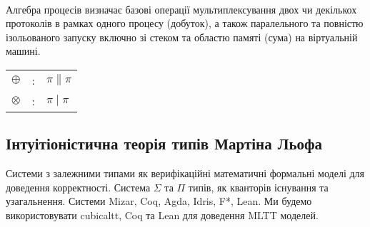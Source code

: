 \documentclass[9pt]{memoir}
\begin{document}
\begin{prooftree}
\end{prooftree}

\begin{prooftree}
\end{prooftree}

\begin{prooftree}
\end{prooftree}
\paragraph{}

    \paragraph{}
    Алгебра процесів визначає базові операції мультиплексування двох чи декількох
    протоколів в рамках одного процесу (добуток), а також паралельного та повністю
    ізольованого запуску включно зі стеком та областю памяті (сума) на
    віртуальній машині.

\begin{center}
\begin{tabular}{lcl}
$\oplus$   &:& $\pi \parallel \pi$\\
$\otimes$  &:& $\pi \mid \pi$\\
\end{tabular}
\end{center}

\newpage
    \subsection{Інтуітіоністична теорія типів Мартіна Льофа}
    Системи з залежними типами як верифікаційні математичні формальні моделі
    для доведення корректності. Система $\Sigma$ та $\Pi$ типів, як кванторів
    існування та узагальнення. Системи Mizar, Coq, Agda, Idris, F*, Lean. Ми будемо
    використовувати cubicaltt, Coq та Lean для доведення MLTT моделей.
\end{document}
